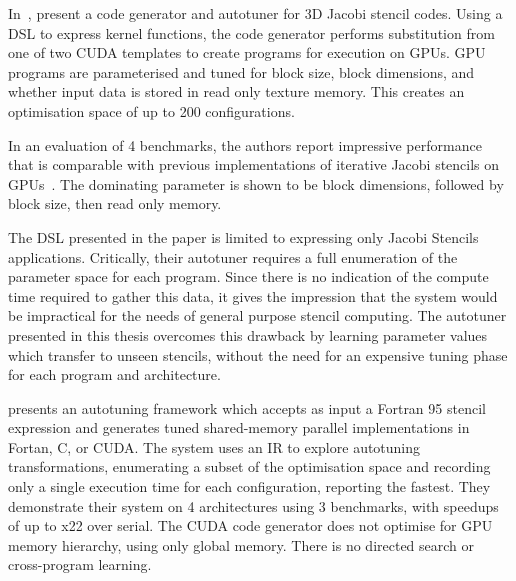 In~\cite{Zhang2013a}, \citeauthor{Zhang2013a} present a code generator
and autotuner for 3D Jacobi stencil codes. Using a DSL to express
kernel functions, the code generator performs substitution from one of
two CUDA templates to create programs for execution on GPUs. GPU
programs are parameterised and tuned for block size, block dimensions,
and whether input data is stored in read only texture memory. This
creates an optimisation space of up to 200 configurations.

In an evaluation of 4 benchmarks, the authors report impressive
performance that is comparable with previous implementations of
iterative Jacobi stencils on
GPUs~\cite{Holewinski2012,Phillips2010}. The dominating parameter is
shown to be block dimensions, followed by block size, then read only
memory.

%

The DSL presented in the paper is limited to expressing only Jacobi
Stencils applications. Critically, their autotuner requires a full
enumeration of the parameter space for each program. Since there is no
indication of the compute time required to gather this data, it gives
the impression that the system would be impractical for the needs of
general purpose stencil computing. The autotuner presented in this
thesis overcomes this drawback by learning parameter values which
transfer to unseen stencils, without the need for an expensive tuning
phase for each program and architecture.



\citeauthor{Kamil2010} presents an autotuning framework which accepts
as input a Fortran 95 stencil expression and generates tuned
shared-memory parallel implementations in Fortan, C, or CUDA. The
system uses an IR to explore autotuning transformations, enumerating a
subset of the optimisation space and recording only a single execution
time for each configuration, reporting the fastest. They demonstrate
their system on 4 architectures using 3 benchmarks, with speedups of
up to x22 over serial. The CUDA code generator does not optimise for
GPU memory hierarchy, using only global memory. There is no directed
search or cross-program learning.

